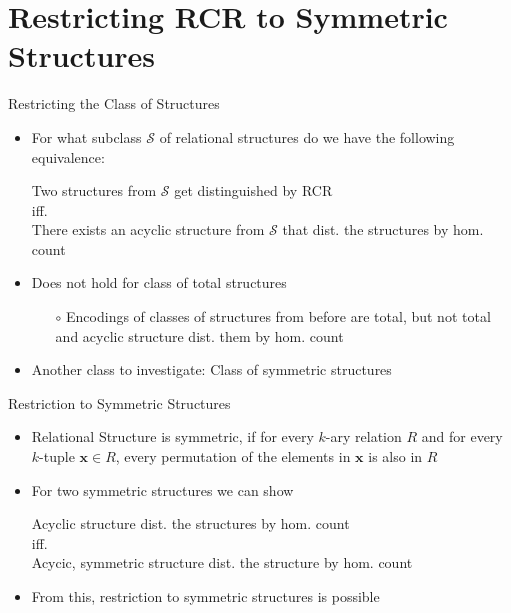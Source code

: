 \documentclass[aspectratio=169]{beamer}
\begin{document}
	\section{Restricting RCR to Symmetric Structures}
	
	\begin{frame}{Restricting the Class of Structures}
		\begin{itemize}
			\item For what subclass $\mathcal S$ of relational structures do we have the following equivalence:
			\begin{center}
				Two structures from $\mathcal S$ get distinguished by RCR\\
				iff.\\
				There exists an acyclic structure from $\mathcal S$ that dist. the structures by hom. count
			\end{center}
			\item Does not hold for class of total structures
			\begin{itemize}
				\item[$\circ$] Encodings of classes of structures from before are total, but not total and acyclic structure dist. them by hom. count
			\end{itemize}
			\item Another class to investigate: Class of symmetric structures
		\end{itemize}
	\end{frame}
	
	\begin{frame}{Restriction to Symmetric Structures}
		\begin{itemize}
			\item Relational Structure is symmetric, if for every $k$-ary relation $R$ and for every $k$-tuple $\mathbf x\in R$, every permutation of the elements in $\mathbf x$ is also in $R$
			\item For two symmetric structures we can show
			\begin{center}
				Acyclic structure dist. the structures by hom. count\\
				iff.\\
				Acycic, symmetric structure dist. the structure by hom. count
			\end{center}
			\item From this, restriction to symmetric structures is possible
		\end{itemize}
	\end{frame}
	
\end{document}
